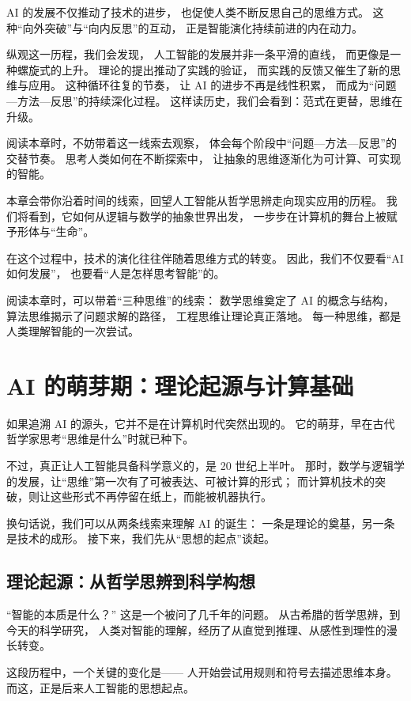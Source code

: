 AI 的发展不仅推动了技术的进步，
也促使人类不断反思自己的思维方式。
这种“向外突破”与“向内反思”的互动，
正是智能演化持续前进的内在动力。

纵观这一历程，我们会发现，
人工智能的发展并非一条平滑的直线，
而更像是一种螺旋式的上升。
理论的提出推动了实践的验证，
而实践的反馈又催生了新的思维与应用。
这种循环往复的节奏，
让 AI 的进步不再是线性积累，
而成为“问题—方法—反思”的持续深化过程。
这样读历史，我们会看到：范式在更替，思维在升级。

阅读本章时，不妨带着这一线索去观察，
体会每个阶段中“问题—方法—反思”的交替节奏。
思考人类如何在不断探索中，
让抽象的思维逐渐化为可计算、可实现的智能。

本章会带你沿着时间的线索，回望人工智能从哲学思辨走向现实应用的历程。
我们将看到，它如何从逻辑与数学的抽象世界出发，
一步步在计算机的舞台上被赋予形体与“生命”。

在这个过程中，技术的演化往往伴随着思维方式的转变。
因此，我们不仅要看“AI 如何发展”，
也要看“人是怎样思考智能”的。

阅读本章时，可以带着“三种思维”的线索：
数学思维奠定了 AI 的概念与结构，
算法思维揭示了问题求解的路径，
工程思维让理论真正落地。
每一种思维，都是人类理解智能的一次尝试。

\section{AI 的萌芽期：理论起源与计算基础}

如果追溯 AI 的源头，它并不是在计算机时代突然出现的。
它的萌芽，早在古代哲学家思考“思维是什么”时就已种下。

不过，真正让人工智能具备科学意义的，是 20 世纪上半叶。
那时，数学与逻辑学的发展，让“思维”第一次有了可被表达、可被计算的形式；
而计算机技术的突破，则让这些形式不再停留在纸上，而能被机器执行。

换句话说，我们可以从两条线索来理解 AI 的诞生：
一条是理论的奠基，另一条是技术的成形。
接下来，我们先从“思想的起点”谈起。

\subsection{理论起源：从哲学思辨到科学构想}

“智能的本质是什么？”
这是一个被问了几千年的问题。
从古希腊的哲学思辨，到今天的科学研究，
人类对智能的理解，经历了从直觉到推理、从感性到理性的漫长转变。

这段历程中，一个关键的变化是——
人开始尝试用规则和符号去描述思维本身。
而这，正是后来人工智能的思想起点。

